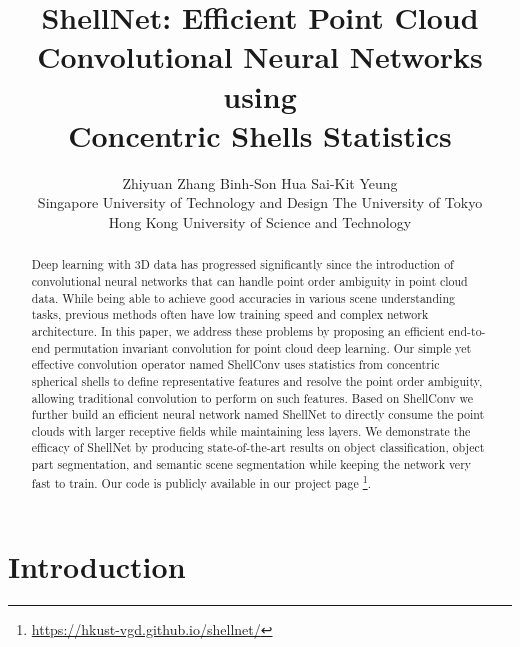 \documentclass[10pt,twocolumn,letterpaper]{article}
\begin{document}
\title{ShellNet: Efficient Point Cloud Convolutional Neural Networks using \\Concentric Shells Statistics}


\author{
Zhiyuan Zhang \hspace{0.2in}
Binh-Son Hua \hspace{0.2in}
Sai-Kit Yeung
\vspace{0.1in}\\
Singapore University of Technology and Design \quad
The University of Tokyo
\\
Hong Kong University of Science and Technology
}

\maketitle
\ificcvfinal\thispagestyle{empty}\fi

\def\ournet{ShellNet\xspace}
\def\ourconv{ShellConv\xspace}
\def\smallgap{\vspace{0.05in}}
\newcommand{\new}[1]{#1}
\begin{abstract}
   Deep learning with 3D data has progressed significantly since the introduction of convolutional neural networks that can handle point order ambiguity in point cloud data. While being able to achieve good accuracies in various scene understanding tasks, previous methods often have low training speed and complex network architecture. In this paper, we address these problems by proposing an efficient end-to-end permutation invariant convolution for point cloud deep learning. Our simple yet effective convolution operator named \ourconv uses statistics from concentric spherical shells to define representative features and resolve the point order ambiguity, allowing traditional convolution to perform on such features. Based on \ourconv we further build an efficient neural network named \ournet to directly consume the point clouds with larger receptive fields while maintaining less layers. We demonstrate the efficacy of \ournet by producing state-of-the-art results on object classification, object part segmentation, and semantic scene segmentation while keeping the network very fast to train. Our code is publicly available in our project page \footnote{\url{https://hkust-vgd.github.io/shellnet/}}.
\end{abstract}

\section{Introduction}
\label{indroduction}
\end{document}
